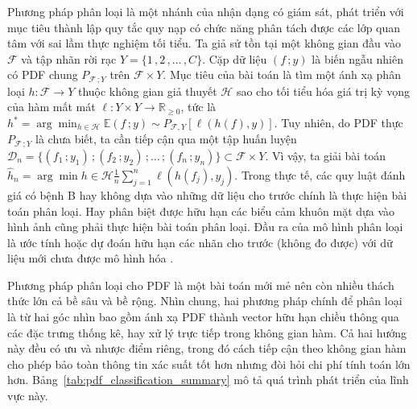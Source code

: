 \documentclass[a4paper,oneside]{book} %
\theoremstyle{plain}
\theoremstyle{plain}
\theoremstyle{nonumberplain}
\begin{document}
Phương pháp phân loại là một nhánh của nhận dạng có giám sát, phát triển với mục tiêu thành lập quy tắc quy nạp có chức năng phân tách được các lớp quan tâm với sai lầm thực nghiệm tối tiểu.  Ta giả sử tồn tại một không gian đầu vào $\mathcal{F}$ và tập nhãn rời rạc ${Y} = \{1\,,2\,, \ldots\,, C\}$. Cặp dữ liệu $(f\,; y)$ là biến ngẫu nhiên có PDF chung $P_{\mathcal{F}\,;Y}$ trên $\mathcal{F} \times {Y}$.  Mục tiêu của bài toán là tìm một ánh xạ phân loại $h : \mathcal{F} \to {Y}$ thuộc không gian giả thuyết $\mathcal{H}$ sao cho tối tiểu hóa giá trị kỳ vọng của hàm mất mát $\ell : {Y} \times {Y} \to \mathbb{R}_{\ge 0}$, tức là $
h^* = \arg\min_{h \in \mathcal{H}} \mathbb{E}{(f\,;y)\sim P_{\mathcal{F},Y}} \left[\ell(h(f), y)\right].$ Tuy nhiên, do PDF thực $P_{\mathcal{F}\,;{Y}}$ là chưa biết, ta cần tiếp cận qua một tập huấn luyện $\mathcal{D}_n = \{(f_1\,; y_1)\,;(f_2\,;y_2)\,; \ldots\,; (f_n\,; y_n)\} \subset \mathcal{F} \times {Y}$. Vì vậy, ta giải bài toán $
\hat{h}_n = \arg\min{h \in \mathcal{H}} \frac{1}{n} \sum_{j=1}^n \ell(h(f_j), y_j).
$
Trong thực tế, các quy luật đánh giá có bệnh B hay không dựa vào những dữ liệu cho trước chính là thực hiện bài toán phân loại. Hay phân biệt được hữu hạn các biểu cảm khuôn mặt dựa vào hình ảnh cũng phải thực hiện bài toán phân loại. Đầu ra của mô hình phân loại là ước tính hoặc dự đoán hữu hạn các nhãn cho trước (không đo được) với dữ liệu mới chưa được mô hình hóa \cite{Fillmore-Patrick_2025}. 

Phương pháp phân loại cho PDF là một bài toán mới mẻ nên còn nhiều thách thức lớn cả bề sâu và bề rộng. Nhìn chung, hai phương pháp chính để phân loại là từ hai góc nhìn bao gồm ánh xạ PDF thành vector hữu hạn chiều thông qua các đặc trưng thống kê, hay xử lý trực tiếp trong không gian hàm. Cả hai hướng này đều có ưu và nhược điểm riêng, trong đó cách tiếp cận theo không gian hàm cho phép bảo toàn thông tin xác suất tốt hơn nhưng đòi hỏi chi phí tính toán lớn hơn. Bảng~\ref{tab:pdf_classification_summary} mô tả quá trình phát triển của lĩnh vực này. 
\end{document}
